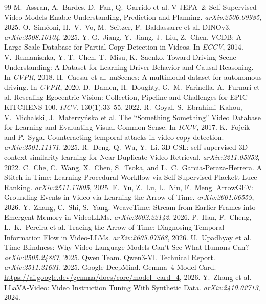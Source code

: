 \documentclass{article}
\theoremstyle{remark}
\begin{document}
\begin{thebibliography}{99}
 M.~Assran, A.~Bardes, D.~Fan, Q.~Garrido et al. V-JEPA~2: Self-Supervised Video Models Enable Understanding, Prediction and Planning. \emph{arXiv:2506.09985}, 2025.
 O.~Sim\'{e}oni, H.~V.~Vo, M.~Seitzer, F.~Baldassarre et al. DINOv3. \emph{arXiv:2508.10104}, 2025.
 Y.-G.~Jiang, Y.~Jiang, J.~Liu, Z.~Chen. VCDB: A Large-Scale Database for Partial Copy Detection in Videos. In \emph{ECCV}, 2014.
 V.~Ramanishka, Y.-T.~Chen, T.~Misu, K.~Saenko. Toward Driving Scene Understanding: A Dataset for Learning Driver Behavior and Causal Reasoning. In \emph{CVPR}, 2018.
 H.~Caesar et al. nuScenes: A multimodal dataset for autonomous driving. In \emph{CVPR}, 2020.
 D.~Damen, H.~Doughty, G.~M.~Farinella, A.~Furnari et al. Rescaling Egocentric Vision: Collection, Pipeline and Challenges for EPIC-KITCHENS-100. \emph{IJCV}, 130(1):33--55, 2022.
 R.~Goyal, S.~Ebrahimi~Kahou, V.~Michalski, J.~Materzy\'nska et al. The ``Something Something'' Video Database for Learning and Evaluating Visual Common Sense. In \emph{ICCV}, 2017.
 K.~Fojcik and P.~Syga. Counteracting temporal attacks in video copy detection. \emph{arXiv:2501.11171}, 2025.
 R.~Deng, Q.~Wu, Y.~Li. 3D-CSL: self-supervised 3D context similarity learning for Near-Duplicate Video Retrieval. \emph{arXiv:2211.05352}, 2022.
 C.~Che, C.~Wang, X.~Chen, S.~Tsoka, and L.~C.~Garcia-Peraza-Herrera. A Stitch in Time: Learning Procedural Workflow via Self-Supervised Plackett-Luce Ranking. \emph{arXiv:2511.17805}, 2025.
 F.~Yu, Z.~Lu, L.~Niu, F.~Meng. ArrowGEV: Grounding Events in Video via Learning the Arrow of Time. \emph{arXiv:2601.06559}, 2026.
 Y.~Zhang, C.~Shi, S.~Yang. WeaveTime: Stream from Earlier Frames into Emergent Memory in VideoLLMs. \emph{arXiv:2602.22142}, 2026.
 P.~Han, F.~Cheng, L.~K.~Pereira et al. Tracing the Arrow of Time: Diagnosing Temporal Information Flow in Video-LLMs. \emph{arXiv:2605.07568}, 2026.
 U.~Upadhyay et al. Time Blindness: Why Video-Language Models Can't See What Humans Can? \emph{arXiv:2505.24867}, 2025.
 Qwen Team. Qwen3-VL Technical Report. \emph{arXiv:2511.21631}, 2025.
 Google DeepMind. Gemma~4 Model Card. \url{https://ai.google.dev/gemma/docs/core/model_card_4}, 2026.
 Y.~Zhang et al. LLaVA-Video: Video Instruction Tuning With Synthetic Data. \emph{arXiv:2410.02713}, 2024.

\end{thebibliography}
\end{document}
